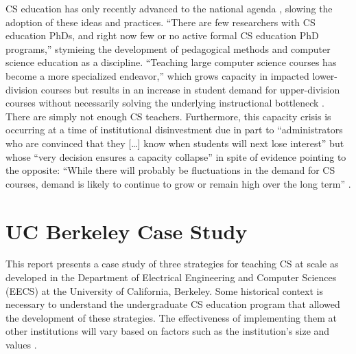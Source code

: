 CS education has only recently advanced to the national agenda \cite{StateofCS2018}, slowing the adoption of these ideas and practices. ``There are few researchers with CS education PhDs, and right now few or no active formal CS education PhD programs,'' \cite{CSforAll2018} stymieing the development of pedagogical methods and computer science education as a discipline. ``Teaching large computer science courses has become a more specialized endeavor,'' which grows capacity in impacted lower-division courses but results in an increase in student demand for upper-division courses without necessarily solving the underlying instructional bottleneck \cite{Roberts:2016}. There are simply not enough CS teachers. Furthermore, this capacity crisis is occurring at a time of institutional disinvestment due in part to ``administrators who are convinced that they [\dots\unkern] know when students will next lose interest'' but whose ``very decision ensures a capacity collapse'' \cite{Roberts:2016} in spite of evidence pointing to the opposite: ``While there will probably be fluctuations in the demand for CS courses, demand is likely to continue to grow or remain high over the long term'' \cite{CSUndergraduateEnrollments}.

\section{UC Berkeley Case Study}

This report presents a case study of three strategies for teaching CS at scale as developed in the Department of Electrical Engineering and Computer Sciences (EECS) at the University of California, Berkeley. Some historical context is necessary to understand the undergraduate CS education program that allowed the development of these strategies. The effectiveness of implementing them at other institutions will vary based on factors such as the institution's size and values \cite{CSUndergraduateEnrollments}.

